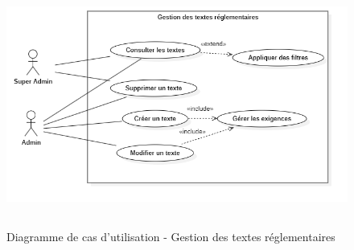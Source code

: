 \begin{figure}[H]
    \centering
    \includegraphics[width=12cm,height=8cm]{images/textsuc.png}
    \caption{Diagramme de cas d'utilisation - Gestion des textes réglementaires}
\end{figure}


